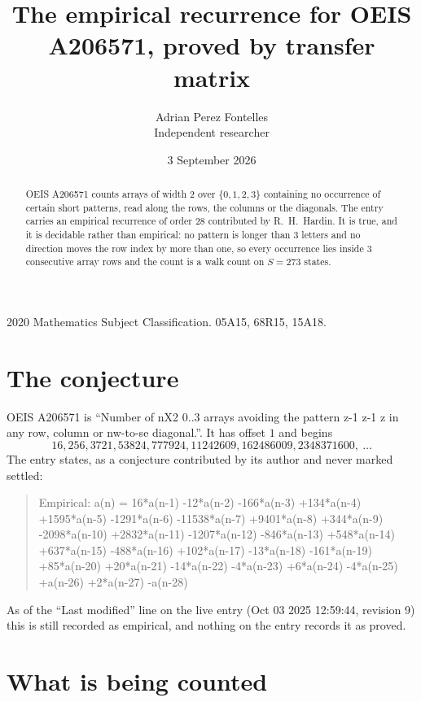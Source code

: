 \documentclass[11pt,a4paper]{article}
\title{The empirical recurrence for OEIS A206571, proved by transfer matrix}
\author{Adrian Perez Fontelles\\ \small Independent researcher}
\date{3 September 2026}
\theoremstyle{plain}
\theoremstyle{definition}
\begin{document}
\maketitle

\begin{abstract}
OEIS A206571 counts arrays of width $2$ over $\{0,1,2,3\}$ containing no occurrence of certain short
patterns, read along the rows, the columns or the diagonals. The entry carries an empirical
recurrence of order $28$ contributed by R.~H.~Hardin. It is true, and it is decidable
rather than empirical: no pattern is longer than $3$ letters and no direction moves the row
index by more than one, so every occurrence lies inside $3$ consecutive array rows and the
count is a walk count on $S=273$ states.
\end{abstract}

\noindent\small 2020 Mathematics Subject Classification. 05A15, 68R15, 15A18.\normalsize

\section{The conjecture}

OEIS A206571 is ``Number of nX2 0..3 arrays avoiding the pattern z-1 z-1 z in any row, column or nw-to-se diagonal.''. It has offset $1$ and begins
\[
16, 256, 3721, 53824, 777924, 11242609, 162486009, 2348371600,\ \dots
\]
The entry states, as a conjecture contributed by its author and never marked settled:
\begin{quote}
Empirical: a(n) = 16*a(n-1) -12*a(n-2) -166*a(n-3) +134*a(n-4) +1595*a(n-5) -1291*a(n-6) -11538*a(n-7) +9401*a(n-8) +344*a(n-9) -2098*a(n-10) +2832*a(n-11) -1207*a(n-12) -846*a(n-13) +548*a(n-14) +637*a(n-15) -488*a(n-16) +102*a(n-17) -13*a(n-18) -161*a(n-19) +85*a(n-20) +20*a(n-21) -14*a(n-22) -4*a(n-23) +6*a(n-24) -4*a(n-25) +a(n-26) +2*a(n-27) -a(n-28)
\end{quote}
As of the ``Last modified'' line on the live entry (Oct 03 2025 12:59:44, revision 9) this is still
recorded as empirical, and nothing on the entry records it as proved.

\section{What is being counted}
\end{document}
